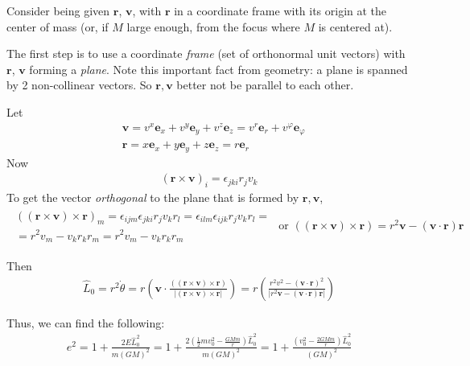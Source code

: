 \documentclass[10pt]{amsart}
\begin{document}
\begin{multicols*}{2}
Consider being given $\mathbf{r}$, $\mathbf{v}$, with $\mathbf{r}$ in a coordinate frame with its origin at the center of mass (or, if $M$ large enough, from the focus where $M$ is centered at). 

The first step is to use a coordinate \emph{frame} (set of orthonormal unit vectors) with $\mathbf{r}$, $\mathbf{v}$ forming a \emph{plane}. Note this important fact from geometry: a plane is spanned by 2 non-collinear vectors. So $\mathbf{r}, \mathbf{v}$ better not be parallel to each other.

Let 
\[
\begin{aligned} 
	& \mathbf{v} = v^x \mathbf{e}_x + v^y \mathbf{e}_y + v^z \mathbf{e}_z = v^r \mathbf{e}_r + v^{\varphi} \mathbf{e}_{\varphi} \\ 
	& \mathbf{r} = x \mathbf{e}_x + y \mathbf{e}_y + z \mathbf{e}_z = r\mathbf{e}_r
\end{aligned} 
\]
Now 
\[
\begin{gathered}
(\mathbf{r} \times \mathbf{v})_i = \epsilon_{jki} r_j v_k 
\end{gathered}
\]
To get the vector \emph{orthogonal} to the plane that is formed by $\mathbf{r}, \mathbf{v}$, 
\[
\begin{gathered}
\begin{gathered}
	((\mathbf{r} \times \mathbf{v}) \times \mathbf{r})_m = \epsilon_{ijm} \epsilon_{jki} r_j v_k r_l = \epsilon_{ilm} \epsilon_{ijk} r_j v_k r_l = \\
	= r^2 v_m - v_k r_k r_m = r^2 v_m - v_k r_k r_m
\end{gathered}
\text{ or } ((\mathbf{r} \times \mathbf{v}) \times \mathbf{r}) = r^2 \mathbf{v} - (\mathbf{v} \cdot \mathbf{r}) \mathbf{r}
\end{gathered}
\]

Then
\[
\begin{gathered}
\widehat{L}_0 = r^2 \dot{\theta} = r \left( \mathbf{v} \cdot  \frac{ ((\mathbf{r} \times \mathbf{v}) \times \mathbf{r}) }{ | (\mathbf{r} \times \mathbf{v} ) \times \mathbf{r} | } \right) = r \left( \frac{r^2 v^2 - (\mathbf{v} \cdot \mathbf{r})^2 }{ |r^2 \mathbf{v} - (\mathbf{v} \cdot \mathbf{r}) \mathbf{r} | } \right) 
\end{gathered}
\]

Thus, we can find the following:
\[
\begin{gathered} 
e^2 = 1 + \frac{ 2 E \widehat{L}_0^2 }{ m (GM)^2 } = 1 + \frac{ 2 \left( \frac{1}{2} m v_0^2 - \frac{GM m }{r} \right) \widehat{L}_0^2 }{ m (GM)^2 }  = 1 + \frac{\left( v_0^2 - \frac{2GMm}{r} \right) \widehat{L}_0^2 }{ (GM)^2 }
\end{gathered} 
\]


\end{multicols*}
\end{document}
